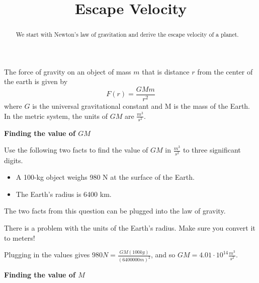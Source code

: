 \documentclass{ximera}
\title{Escape Velocity}
\begin{document}
\begin{abstract}
We start with Newton's law of gravitation and derive the escape velocity of a planet.
\end{abstract}
\maketitle

\begin{axiom}

The force of gravity on an object of mass $m$ that is distance $r$ from the center of the earth is given by
$$ F(r) = \frac{G M m}{r^2}$$
where $G$ is the universal gravitational constant and M is the mass of the Earth. In the metric system, the units of $G M$ are $\frac{m^3}{s^2}$.
\end{axiom}

\textbf{Finding the value of $GM$}

\begin{question}
Use the following two facts to find the value of $GM$ in $\frac{m^3}{s^2}$ to three significant digits. 
\begin{itemize}
\item A 100-kg object weighs 980 N at the surface of the Earth.
\item The Earth's radius is 6400 km.
\end{itemize}
\begin{solution}
\begin{multiple-choice}
\end{multiple-choice}
\begin{hint}
The two facts from this question can be plugged into the law of gravity.
\end{hint}
\begin{hint}
There is a problem with the units of the Earth's radius. Make sure you convert it to meters!
\end{hint}
Plugging in the values gives $980 N = \frac{GM (100 kg)}{(6400000 m)^2}$, and so $GM = 4.01 \cdot 10^{14} \frac{m^3}{s^2}$.
\end{solution}
\end{question}

\textbf{Finding the value of $M$}
\end{document}
